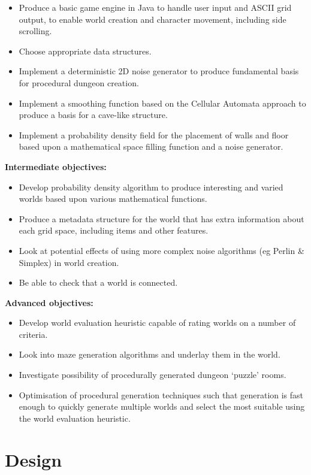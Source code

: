 \documentclass[12pt,a4paper]{article}
\begin{document}
\begin{itemize}%

	\item Produce a basic game engine in Java to handle user input and ASCII grid output, to enable world creation and character movement, including side scrolling.
	\item Choose appropriate data structures.
	\item Implement a deterministic 2D noise generator to produce fundamental basis for procedural dungeon creation.
	\item Implement a smoothing function based on the Cellular Automata approach to produce a basis for a cave-like structure.
	\item Implement a probability density field for the placement of walls and floor based upon a mathematical space filling function and a noise generator. 
\end{itemize}
\textbf{Intermediate objectives:}
\begin{itemize}
	\item Develop probability density algorithm to produce interesting and varied worlds based upon various mathematical functions.
	\item Produce a metadata structure for the world that has extra information about each grid space, including items and other features.
	\item Look at potential effects of using more complex noise algorithms (eg Perlin \& Simplex) in world creation.
	\item Be able to check that a world is connected.
\end{itemize}
\textbf{Advanced objectives:}
\begin{itemize}
	
	\item Develop world evaluation heuristic capable of rating worlds on a number of criteria.
	\item Look into maze generation algorithms and underlay them in the world.
	\item Investigate possibility of procedurally generated dungeon `puzzle' rooms.
	\item Optimisation of procedural generation techniques such that generation is fast enough to quickly generate multiple worlds and select the most suitable using the world evaluation heuristic. 
\end{itemize}


\section{Design}
\end{document}
